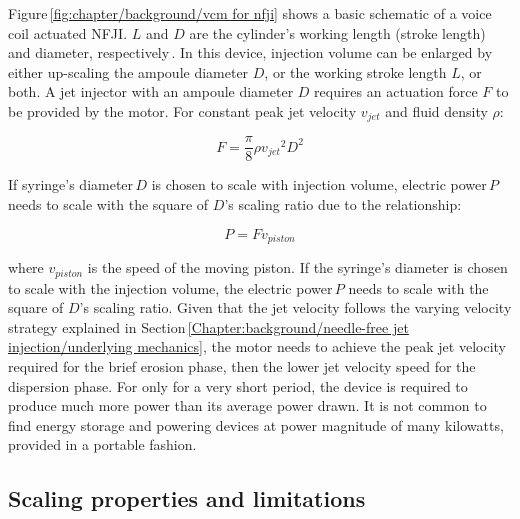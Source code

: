     
    Figure\,\ref{fig:chapter/background/vcm for nfji} shows a basic schematic of a voice coil actuated \acs{NFJI}. $L$ and $D$ are the cylinder’s working length (stroke length) and diameter, respectively\,\cite{ruddy2014}. In this device, injection volume can be enlarged by either up-scaling the ampoule diameter $D$, or the working stroke length $L$, or both. A jet injector with an ampoule diameter $D$ requires an actuation force $F$ to be provided by the motor. For constant peak jet velocity $v_{jet}$ and fluid density $\rho$:
    
    
    \begin{equation}
        F=\frac{\pi}{8}\rho {v_{jet}}^2 D^2
        \label{eq:force produce relationship in motor powered NFJI}
    \end{equation}
    
    
    If syringe’s diameter\,$D$ is chosen to scale with injection volume, electric power\,$P$ needs to scale with the square of $D$’s scaling ratio due to the relationship:
    
    
    \begin{equation}
        P=F v_{piston}
        \label{eq:power required for F and v_piston}
    \end{equation}
    
    
    where $v_{piston}$ is the speed of the moving piston. If the syringe’s diameter  is chosen to scale with the injection volume, the electric power\,$P$ needs to scale with the square of $D$’s scaling ratio. Given that the jet velocity follows the varying velocity strategy explained in Section\,\ref{Chapter:background/needle-free jet injection/underlying mechanics}, the motor needs to achieve the peak jet velocity required for the brief erosion phase, then the lower jet velocity speed for the dispersion phase. For only for a very short period, the device is required to produce much more power than its average power drawn. It is not common to find energy storage and powering devices at power magnitude of many kilowatts, provided in a portable fashion.
    
    
    \subsection{Scaling properties and limitations} \label{Chapter:background/voice coil motors for NFJI/scaling and limitation}
    
